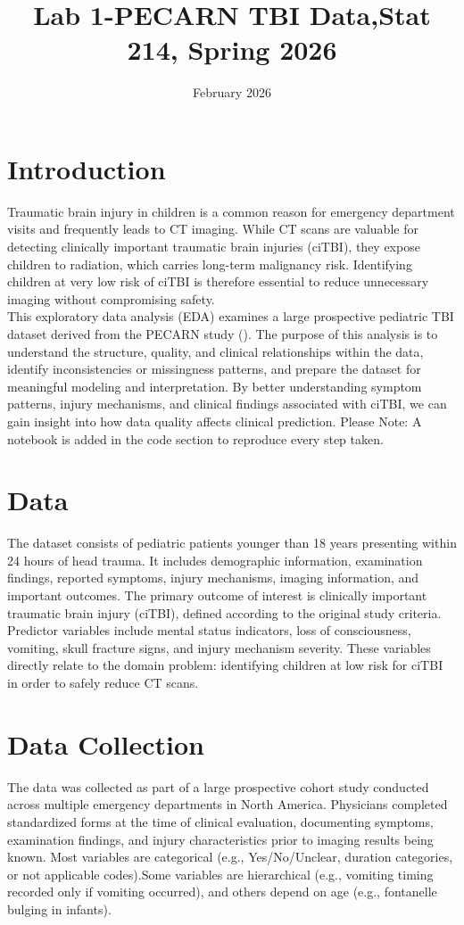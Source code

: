 \documentclass[11pt]{article}
\title{Lab 1-PECARN TBI Data,Stat 214, Spring 2026}
\date{February 2026}
\begin{document}
\maketitle

\section{Introduction}
Traumatic brain injury in children is a common reason for emergency department visits and frequently leads to CT imaging. While CT scans are valuable for detecting clinically important traumatic brain injuries (ciTBI), they expose children to radiation, which carries long-term malignancy risk. Identifying children at very low risk of ciTBI is therefore essential to reduce unnecessary imaging without compromising safety.\\
This exploratory data analysis (EDA) examines a large prospective pediatric TBI dataset derived from the PECARN study (\cite{kuppermann2009identification}). The purpose of this analysis is to understand the structure, quality, and clinical relationships within the data, identify inconsistencies or missingness patterns, and prepare the dataset for meaningful modeling and interpretation. By better understanding symptom patterns, injury mechanisms, and clinical findings associated with ciTBI, we can gain insight into how data quality affects clinical prediction. 
Please Note: A notebook is added in the code section to reproduce every step taken.

\section{Data}
The dataset consists of pediatric patients younger than 18 years presenting within 24 hours of head trauma. It includes demographic information, examination findings, reported symptoms, injury mechanisms, imaging information, and important outcomes.
The primary outcome of interest is clinically important traumatic brain injury (ciTBI), defined according to the original study criteria. Predictor variables include mental status indicators, loss of consciousness, vomiting, skull fracture signs, and injury mechanism severity. These variables directly relate to the domain problem: identifying children at low risk for ciTBI in order to safely reduce CT scans.
\section{Data Collection}
The data was collected as part of a large prospective cohort study conducted across multiple emergency departments in North America. Physicians completed standardized forms at the time of clinical evaluation, documenting symptoms, examination findings, and injury characteristics prior to imaging results being known.
Most variables are categorical (e.g., Yes/No/Unclear, duration categories, or not applicable codes).Some variables are hierarchical (e.g., vomiting timing recorded only if vomiting occurred), and others depend on age (e.g., fontanelle bulging in infants). 
\end{document}
